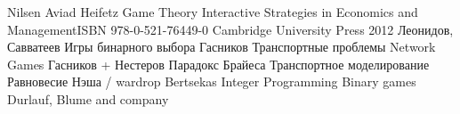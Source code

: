 \begin{thebibliography}{99}
		Nilsen
	Aviad Heifetz Game Theory Interactive Strategies in Economics and ManagementISBN 978-0-521-76449-0 Cambridge University Press 2012
	 Леонидов, Савватеев Игры бинарного выбора
Гасников Транспортные проблемы
Network Games
Гасников + Нестеров
Парадокс Брайеса
Транспортное моделирование
Равновесие Нэша / wardrop
Bertsekas Integer Programming
Binary games
Durlauf, Blume and company
\end{thebibliography}
